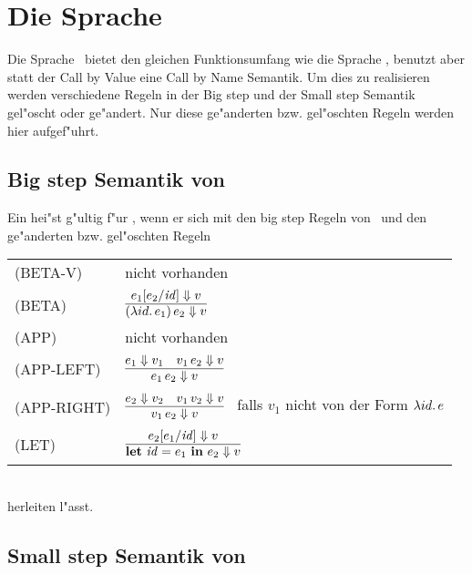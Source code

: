 \section{Die Sprache \LONECBN}

Die Sprache \LONECBN \ bietet den gleichen Funktionsumfang wie die Sprache \LONE, benutzt aber statt der 
Call by Value eine Call by Name Semantik. Um dies zu realisieren werden verschiedene Regeln in der Big step 
und der Small step Semantik gel"oscht oder ge"andert. Nur diese ge"anderten bzw. gel"oschten Regeln werden hier
aufgef"uhrt.

\subsection{Big step Semantik von \LONECBN}

Ein  hei"st g"ultig f"ur \LONECBN, wenn er sich mit den big step Regeln von \LONE\ und den ge"anderten bzw. gel"oschten Regeln\\[5mm]
  \begin{tabular}{ll}
     \mbox{(BETA-V)}      & nicht vorhanden \\[3mm]
     \mbox{(BETA)}        & $\regel{e_1[e_2/\id] \eval v}
                                   {(\abstr{id}{e_1})\,e_2 \eval v}$ \\[5mm]
     \mbox{(APP)}         & nicht vorhanden \\[3mm]
     \mbox{(APP-LEFT)}    & $\regel{e_1 \eval v_1 \quad v_1\,e_2 \eval v}
                                   {e_1\,e_2 \eval v}$ \\[3mm]
     \mbox{(APP-RIGHT)}   & $\regel{e_2 \eval v_2 \quad v_1\,v_2 \eval v}
                                   {v_1\,e_2 \eval v}$   \ 
                                   falls ${v_1}$ nicht von der Form $\lambda id.\,e$ \\[5mm]
     \mbox{(LET)}         & $\regel{e_2[e_1/\id] \eval v}
                                   {\bli{\id}{e_1}{e_2} \eval v}$
  \end{tabular}\\[7mm]
herleiten l"asst.


\subsection{Small step Semantik von \LONECBN}

